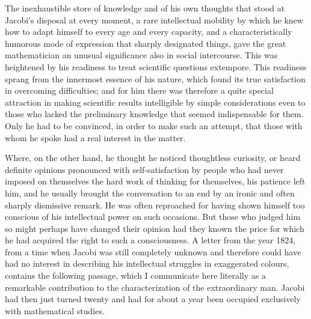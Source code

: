 \documentclass[11pt]{article}
\begin{document}
The inexhaustible store of knowledge and of his own thoughts that stood at Jacobi's disposal at every moment, a rare intellectual mobility by which he knew how to adapt himself to every age and every capacity, and a characteristically humorous mode of expression that sharply designated things, gave the great mathematician an unusual significance also in social intercourse. This was heightened by his readiness to treat scientific questions extempore. This readiness sprang from the innermost essence of his nature, which found its true satisfaction in overcoming difficulties; and for him there was therefore a quite special attraction in making scientific results intelligible by simple considerations even to those who lacked the preliminary knowledge that seemed indispensable for them. Only he had to be convinced, in order to make such an attempt, that those with whom he spoke had a real interest in the matter.

Where, on the other hand, he thought he noticed thoughtless curiosity, or heard definite opinions pronounced with self-satisfaction by people who had never imposed on themselves the hard work of thinking for themselves, his patience left him, and he usually brought the conversation to an end by an ironic and often sharply dismissive remark. He was often reproached for having shown himself too conscious of his intellectual power on such occasions. But those who judged him so might perhaps have changed their opinion had they known the price for which he had acquired the right to such a consciousness. A letter from the year 1824, from a time when Jacobi was still completely unknown and therefore could have had no interest in describing his intellectual struggles in exaggerated colours, contains the following passage, which I communicate here literally as a remarkable contribution to the characterization of the extraordinary man. Jacobi had then just turned twenty and had for about a year been occupied exclusively with mathematical studies.
\end{document}
